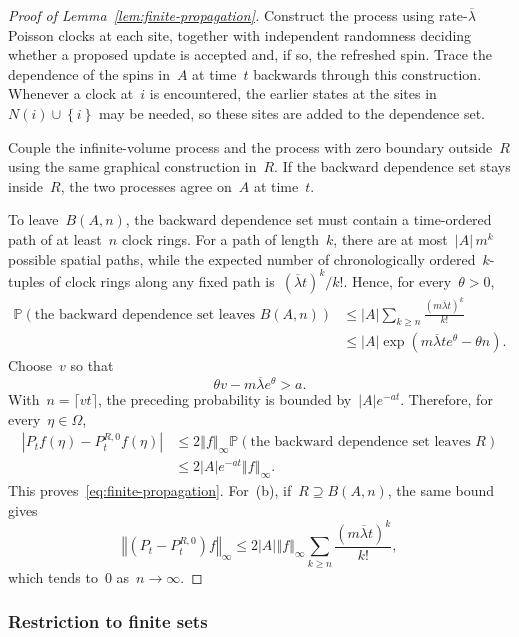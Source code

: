 \documentclass[EJP,preprint,NODS,nobera]{ejpecp}
\newcommand{\pP}{\mathbb{P}}
\newcommand{\bb}[1]{\left(#1\right)}
\newcommand{\cb}[1]{\left\{#1\right\}}
\newcommand{\norm}[1]{\left\Vert#1\right\Vert}
\newcommand{\abs}[1]{\left|#1\right|}
\newcommand{\rev}[1]{{\color{red}#1}}
\begin{document}
\begin{proof}[Proof of Lemma~\ref{lem:finite-propagation}]
Construct the process using rate-$\overline\lambda$ Poisson clocks at each site,
together with independent randomness deciding whether a proposed update is
accepted and, if so, the refreshed spin. Trace the dependence of the spins in~$A$ at time~$t$ backwards through this construction. Whenever a clock at~$i$ is encountered, the earlier states at the sites in~$N(i)\cup\cb{i}$ may be needed, so these sites are added to the dependence
set.

Couple the infinite-volume process and the process with zero boundary outside~$R$ using the same graphical construction in~$R$. If the backward dependence
set stays inside~$R$, the two processes agree on~$A$ at time~$t$.

To leave~$B(A,n)$, the backward dependence set must contain a time-ordered path
of at least~$n$ clock rings. For a path of length~$k$, there are at most~$\abs A\,m^k$ possible spatial paths, while the expected number of
chronologically ordered~$k$-tuples of clock rings along any fixed path is~$(\overline\lambda t)^k/k!$. Hence, for every~$\theta>0$,
\begin{align*}
\pP\bb{\text{the backward dependence set leaves }B(A,n)}
&\leq
\abs A
\sum_{k\geq n}
\frac{\bb{m\overline\lambda t}^k}{k!}
\\
&\leq
\abs A
\exp\bb{
m\overline\lambda t e^\theta-\theta n
}.
\end{align*}
Choose~$v$ so that
\begin{equation*}
\theta v-m\overline\lambda e^\theta>a.
\end{equation*}
With~$n=\lceil vt\rceil$, the preceding probability is bounded by~$\abs A e^{-at}$. Therefore, for
every~$\eta\in\Omega$,
\begin{align*}
\abs{P_tf(\eta)-P_t^{R,0}f(\eta)}
&\leq
2\norm f_\infty
\pP\bb{\text{the backward dependence set leaves }R}
\\
&\leq
2\abs A e^{-at}\norm f_\infty.
\end{align*}
This proves~\eqref{eq:finite-propagation}. For~(b), if~$R\supseteq B(A,n)$,
the same bound gives
\begin{equation*}
\norm{\bb{P_t-P_t^{R,0}}f}_\infty
\leq
2\abs A\norm f_\infty
\sum_{k\geq n}
\frac{\bb{m\overline\lambda t}^k}{k!},
\end{equation*}
which tends to~$0$ as~$n\to\infty$.
\end{proof}

\subsubsection{\texorpdfstring{\rev{Restriction to finite sets}}{Restriction to finite sets}}
\label{subsec:zero-boundary-proof}
\end{document}
